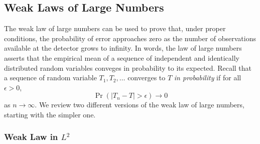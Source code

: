 \subsection{Weak Laws of Large Numbers}

The weak law of large numbers can be used to prove that, under proper conditions, the probability of error approaches zero as the number of observations available at the detector grows to infinity.
In words, the law of large numbers asserts that the empirical mean of a sequence of independent and identically distributed random variables conveges in probability to its expected.
Recall that a sequence of random variable $T_1, T_2, \ldots$ converges to $T$ \emph{in probability} if for all $\epsilon > 0$,
\begin{equation*}
\Pr(|T_n - T| > \epsilon) \rightarrow 0
\end{equation*}
as $n \rightarrow \infty$.
We review two different versions of the weak law of large numbers, starting with the simpler one.


\subsubsection{Weak Law in $L^2$}

